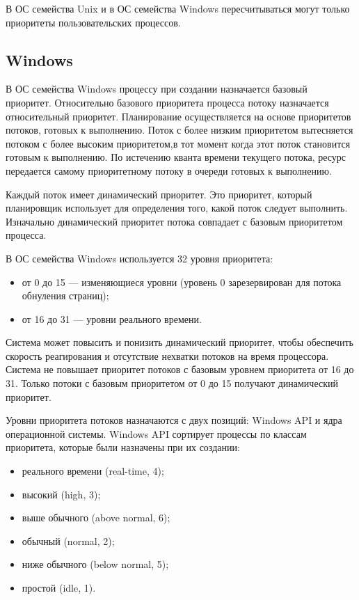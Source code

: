 \documentclass[a4paper,14pt]{extarticle}
\begin{document}
В ОС семейства Unix и в ОС семейства Windows пересчитываться могут только
приоритеты пользовательских процессов.

\subsection{Windows} 


В ОС семейства Windows  процессу при создании назначается базовый приоритет. Относительно
базового приоритета процесса потоку назначается относительный приоритет. Планирование осуществляется на основе приоритетов потоков, готовых к выполнению. Поток с более низким приоритетом 
вытесняется потоком с более высоким приоритетом,в тот момент когда этот поток становится готовым к выполнению. По истечению кванта времени 
текущего потока, ресурс передается самому приоритетному потоку в очереди готовых к выполнению.

Каждый поток имеет динамический приоритет. Это приоритет, который планировщик использует для определения того, какой поток следует 
выполнить. Изначально динамический приоритет потока совпадает с базовым приоритетом процесса.

В ОС семейства Windows используется 32 уровня приоритета:
\begin{itemize}
	\item от 0 до 15 --- изменяющиеся уровни (уровень 0 зарезервирован для потока обнуления страниц);
	\item от 16 до 31 --- уровни реального времени.
\end{itemize}

Система может повысить и понизить динамический приоритет, чтобы обеспечить скорость реагирования и отсутствие нехватки потоков на время 
процессора. Система не повышает приоритет потоков с базовым уровнем приоритета от 16 до 31. Только потоки с базовым приоритетом от 0 до 
15 получают динамический приоритет.

Уровни приоритета потоков назначаются с двух позиций: Windows API и ядра операционной системы. Windows API сортирует процессы по классам 
приоритета, которые были назначены при их создании:
\begin{itemize}
	\item реального времени (real-time, 4);
	\item высокий (high, 3);
	\item выше обычного (above normal, 6);
	\item обычный (normal, 2);
	\item ниже обычного (below normal, 5); 
	\item простой (idle, 1).
\end{itemize}
\end{document}
